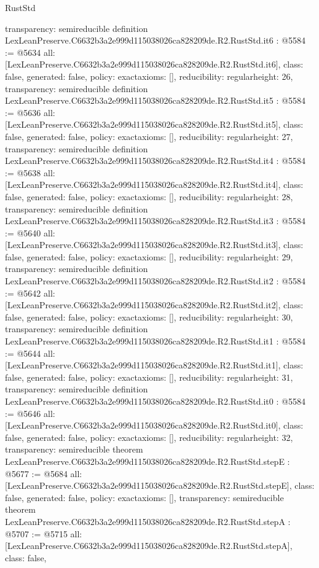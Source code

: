 \begin{lexlean}{RustStd}
\begin{coremodule}
{  transparency: semireducible
}
definition LexLeanPreserve.C6632b3a2e999d115038026ca828209de.R2.RustStd.it6 : @5584 := @5634 {
  all: [LexLeanPreserve.C6632b3a2e999d115038026ca828209de.R2.RustStd.it6],
  class: false,
  generated: false,
  policy: exact{axioms: []},
  reducibility: regular{height: 26},
  transparency: semireducible
}
definition LexLeanPreserve.C6632b3a2e999d115038026ca828209de.R2.RustStd.it5 : @5584 := @5636 {
  all: [LexLeanPreserve.C6632b3a2e999d115038026ca828209de.R2.RustStd.it5],
  class: false,
  generated: false,
  policy: exact{axioms: []},
  reducibility: regular{height: 27},
  transparency: semireducible
}
definition LexLeanPreserve.C6632b3a2e999d115038026ca828209de.R2.RustStd.it4 : @5584 := @5638 {
  all: [LexLeanPreserve.C6632b3a2e999d115038026ca828209de.R2.RustStd.it4],
  class: false,
  generated: false,
  policy: exact{axioms: []},
  reducibility: regular{height: 28},
  transparency: semireducible
}
definition LexLeanPreserve.C6632b3a2e999d115038026ca828209de.R2.RustStd.it3 : @5584 := @5640 {
  all: [LexLeanPreserve.C6632b3a2e999d115038026ca828209de.R2.RustStd.it3],
  class: false,
  generated: false,
  policy: exact{axioms: []},
  reducibility: regular{height: 29},
  transparency: semireducible
}
definition LexLeanPreserve.C6632b3a2e999d115038026ca828209de.R2.RustStd.it2 : @5584 := @5642 {
  all: [LexLeanPreserve.C6632b3a2e999d115038026ca828209de.R2.RustStd.it2],
  class: false,
  generated: false,
  policy: exact{axioms: []},
  reducibility: regular{height: 30},
  transparency: semireducible
}
definition LexLeanPreserve.C6632b3a2e999d115038026ca828209de.R2.RustStd.it1 : @5584 := @5644 {
  all: [LexLeanPreserve.C6632b3a2e999d115038026ca828209de.R2.RustStd.it1],
  class: false,
  generated: false,
  policy: exact{axioms: []},
  reducibility: regular{height: 31},
  transparency: semireducible
}
definition LexLeanPreserve.C6632b3a2e999d115038026ca828209de.R2.RustStd.it0 : @5584 := @5646 {
  all: [LexLeanPreserve.C6632b3a2e999d115038026ca828209de.R2.RustStd.it0],
  class: false,
  generated: false,
  policy: exact{axioms: []},
  reducibility: regular{height: 32},
  transparency: semireducible
}
theorem LexLeanPreserve.C6632b3a2e999d115038026ca828209de.R2.RustStd.stepE : @5677 := @5684 {
  all: [LexLeanPreserve.C6632b3a2e999d115038026ca828209de.R2.RustStd.stepE],
  class: false,
  generated: false,
  policy: exact{axioms: []},
  transparency: semireducible
}
theorem LexLeanPreserve.C6632b3a2e999d115038026ca828209de.R2.RustStd.stepA : @5707 := @5715 {
  all: [LexLeanPreserve.C6632b3a2e999d115038026ca828209de.R2.RustStd.stepA],
  class: false,
}
\end{coremodule}
\end{lexlean}
